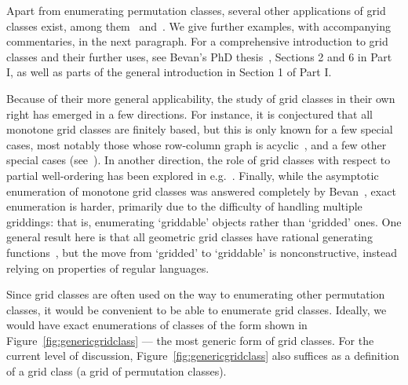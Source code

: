 \documentclass[12pt, a4paper, twoside]{report}
\begin{document}
Apart from enumerating permutation classes, several other applications of grid classes exist, among them~\cite{albert2011enumeration} and~\cite{bevan-new}. We give further examples, with accompanying commentaries, in the next paragraph. For a comprehensive introduction to grid classes and their further uses, see Bevan's PhD thesis~\cite{bevan2015thesis}, Sections 2 and 6 in Part I, as well as parts of the general introduction in Section 1 of Part I.

Because of their more general applicability, the study of grid classes in their own right has emerged in a few directions. For instance, it is conjectured that all monotone grid classes are finitely based, but this is only known for a few special cases, most notably those whose row-column graph is acyclic~\cite{aabrv2013}, and a few other special cases (see~\cite{albert-brignall-2times2, atkinson1997restricted, waton, bevan2015thesis}). In another direction, the role of grid classes with respect to partial well-ordering has been explored in e.g.~\cite{brignall2012pwo, murphy2003pwo, vatter2011pwo}. Finally, while the asymptotic enumeration of monotone grid classes was answered completely by Bevan~\cite{bevan15growth-rates}, exact enumeration is harder, primarily due to the difficulty of handling multiple griddings: that is, enumerating `griddable' objects rather than `gridded' ones. One general result here is that all geometric grid classes have rational generating functions~\cite{aabrv2013}, but the move from `gridded' to `griddable' is nonconstructive, instead relying on properties of regular languages.

Since grid classes are often used on the way to enumerating other permutation classes, it would be convenient to be able to enumerate grid classes. Ideally, we would have exact enumerations of classes of the form shown in Figure~\ref{fig:genericgridclass} --- the most generic form of grid classes. For the current level of discussion, Figure~\ref{fig:genericgridclass} also suffices as a definition of a grid class (a grid of permutation classes).
\end{document}
